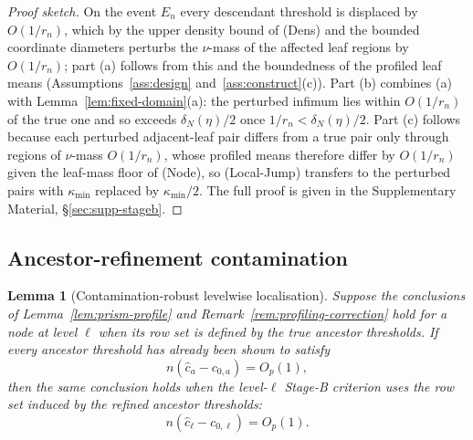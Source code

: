 \documentclass[11pt]{article}
\theoremstyle{plain}
\newtheorem{lemma}[theorem]{Lemma}
\theoremstyle{definition}
\theoremstyle{remark}
\begin{document}
\begin{proof}[Proof sketch]
On the event $E_n$ every descendant threshold is displaced by $O(1/r_n)$,
which by the upper density bound of (Dens) and the bounded coordinate
diameters perturbs the $\nu$-mass of the affected leaf regions by $O(1/r_n)$;
part (a) follows from this and the boundedness of the profiled leaf means
(Assumptions~\ref{ass:design} and~\ref{ass:construct}(c)). Part (b) combines
(a) with Lemma~\ref{lem:fixed-domain}(a): the perturbed infimum lies
within $O(1/r_n)$ of the true one and so exceeds $\delta_N(\eta)/2$ once
$1/r_n<\delta_N(\eta)/2$. Part (c) follows because each perturbed
adjacent-leaf pair differs from a true pair only through regions of $\nu$-mass
$O(1/r_n)$, whose profiled means therefore differ by $O(1/r_n)$ given the
leaf-mass floor of (Node), so (Local-Jump) transfers to the perturbed pairs
with $\kappa_{\min}$ replaced by $\kappa_{\min}/2$. The full proof is given in
the Supplementary Material, \S\ref{sec:supp-stageb}.
\end{proof}

\subsection{Ancestor-refinement contamination}\label{sec:stageb-ancestor}

\begin{lemma}[Contamination-robust levelwise localisation]
\label{lem:ancestor-localisation}
Suppose the conclusions of Lemma~\ref{lem:prism-profile} and
Remark~\ref{rem:profiling-correction} hold for a node at level \(\ell\) when
its row set is defined by the true ancestor thresholds.  If every ancestor
threshold has already been shown to satisfy
\[
  n(\widehat c_a-c_{0,a})=O_p(1),
\]
then the same conclusion holds when the level-\(\ell\) Stage-B criterion uses
the row set induced by the refined ancestor thresholds:
\[
  n(\widehat c_\ell-c_{0,\ell})=O_p(1).
\]
\end{lemma}
\end{document}
